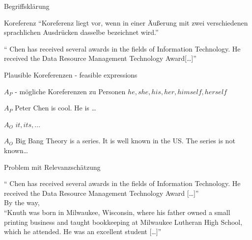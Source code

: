 \documentclass{beamer}
\newcommand{\textnamedentity}{\color{black}}
\newcommand{\textbackground}{\color{gray}}
\newcommand{\textanapher}{\color{blue}}
\begin{document}
\begin{frame}{Begriffsklärung}

\begin{block}{Koreferenz}
	``Koreferenz liegt vor, wenn in einer Äußerung mit zwei verschiedenen sprachlichen Ausdrücken dasselbe bezeichnet wird.''
	\cite{wiki:Koreferenz}
\end{block}


	\textbackground `` \textnamedentity Chen \textbackground has received several awards in the fields of Information Technology. \textanapher He \textbackground received the Data Resource Management Technology Award[\ldots]''
	\cite{wiki:PeterChen}

\end{frame}

\begin{frame}{Plausible Koreferenzen - feasible expressions}
	\begin{block}{$A_P$ - mögliche Koreferenzen zu Personen}
		${he, she, his, her, himself, herself}$
	\end{block}
	\begin{exampleblock}{$A_P$}
		\textnamedentity Peter Chen \textbackground is cool. \textanapher He \textbackground is \ldots
	\end{exampleblock}
	\begin{block}{$A_O$}
		${it, its, \ldots}$
	\end{block}
	\begin{exampleblock}{$A_O$}
		\textnamedentity Big Bang Theory \textbackground is a series. \textanapher It \textbackground is well known in the US. \textanapher The series \textbackground is not known\ldots
	\end{exampleblock}


\end{frame}




\begin{frame}{Problem mit Relevanzschätzung}

	\textbackground `` \textnamedentity Chen \textbackground has received several awards in the fields of Information Technology. \textanapher He \textbackground received the Data Resource Management Technology Award [\ldots]''
	\cite{wiki:PeterChen}
	\\
	By the way,
	\\
	``\textnamedentity Knuth \textbackground was born in Milwaukee, Wisconsin, where \textanapher his \textbackground father owned a small printing business and taught bookkeeping at Milwaukee Lutheran High School, which \textanapher he \textbackground attended. \textanapher He \textbackground was an excellent student [\ldots]''
	\cite{wiki:DonaldKnuth}


\end{frame}
\end{document}
